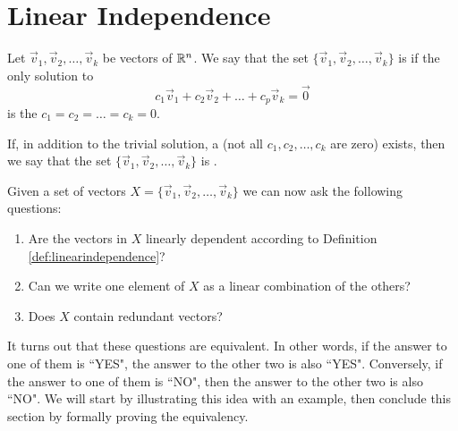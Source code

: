 \documentclass{ximera}
\begin{document}
\section*{Linear Independence}

\begin{definition}\label{def:linearindependence}
Let $\vec{v}_1, \vec{v}_2,\ldots ,\vec{v}_k$ be vectors of $\mathbb{R}^n$.  We say that the set $\{\vec{v}_1, \vec{v}_2,\ldots ,\vec{v}_k\}$ is  if the only solution to 
\begin{equation}\label{eq:defLinInd}c_1\vec{v}_1+c_2\vec{v}_2+\ldots +c_p\vec{v}_k=\vec{0}\end{equation}
is the  $c_1=c_2=\ldots =c_k=0$.

If, in addition to the trivial solution, a  (not all $c_1, c_2,\ldots ,c_k$ are zero) exists, then we say that the set $\{\vec{v}_1, \vec{v}_2,\ldots ,\vec{v}_k\}$ is .
\end{definition}
\begin{remark}\label{remark:LinIndEquiv}
Given a set of vectors $X=\{\vec{v}_1,\vec{v}_2,\dots,\vec{v}_k\}$ we can now ask the following questions:
\begin{enumerate}
\item Are the vectors in $X$ linearly dependent according to Definition \ref{def:linearindependence}?
\item Can we write one element of $X$ as a linear combination of the others?
    \item Does $X$ contain redundant vectors?
\end{enumerate}
It turns out that these questions are equivalent.  In other words, if the answer to one of them is ``YES", the answer to the other two is also ``YES".  Conversely, if the answer to one of them is ``NO", then the answer to the other two is also ``NO".  We will start by illustrating this idea with an example, then conclude this section by formally proving the equivalency.
\end{remark}
\end{document}
